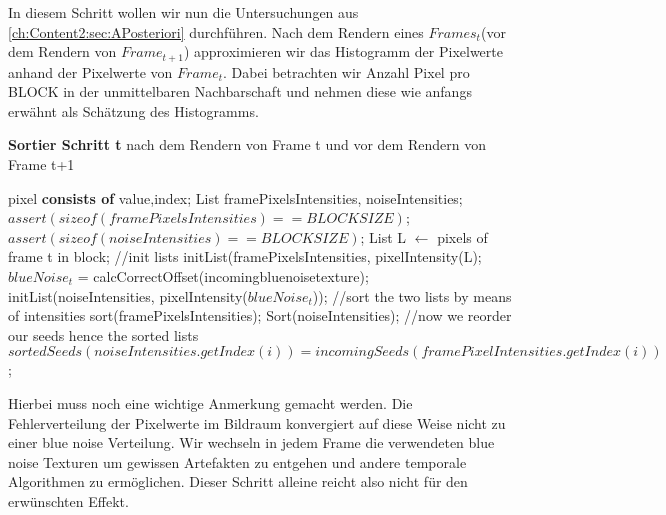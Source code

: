 In diesem Schritt wollen wir nun die Untersuchungen aus 
\ref{ch:Content2:sec:APosteriori} durchführen. Nach dem Rendern eines
$Frames_{t}$(vor dem Rendern von $Frame_{t+1}$) approximieren wir das Histogramm
der Pixelwerte anhand der Pixelwerte von $Frame_{t}$. Dabei betrachten wir
Anzahl Pixel pro BLOCK in der unmittelbaren Nachbarschaft und nehmen diese
wie anfangs erwähnt als Schätzung des Histogramms.

\cite{hal02158423}
\begin{algorithm}[H]
    \caption{\textbf{Sortier Schritt t} nach dem Rendern von Frame t
    und vor dem Rendern von Frame t+1}
    \begin{algorithmic}[1]
        \STATE pixel \textbf{consists of} value,index;
        \STATE List framePixelsIntensities, noiseIntensities;
        \STATE $assert(sizeof(framePixelsIntensities)==BLOCKSIZE)$;
        \STATE $assert(sizeof(noiseIntensities)==BLOCKSIZE)$;
        \STATE List L $\leftarrow$ pixels of frame t in block;
        \STATE \hfill
        \STATE //init lists
        \STATE initList(framePixelsIntensities, pixelIntensity(L);
        \STATE $blueNoise_{t}$ = calcCorrectOffset(incomingbluenoisetexture);
        \STATE initList(noiseIntensities, pixelIntensity($blueNoise_{t}$));
        \STATE \hfill
        \STATE //sort the two lists by means of intensities
        \STATE sort(framePixelsIntensities);
        \STATE Sort(noiseIntensities);
        \STATE \hfill
        \STATE //now we reorder our seeds hence the sorted lists
        \STATE $sortedSeeds(noiseIntensities.getIndex(i)) = incomingSeeds(framePixelIntensities.getIndex(i))$;
        \ENDFOR
    \end{algorithmic}
    \label{alg:Sortier}
\end{algorithm}

Hierbei muss noch eine wichtige Anmerkung gemacht werden. Die Fehlerverteilung
der Pixelwerte im Bildraum konvergiert auf diese Weise nicht zu einer 
blue noise Verteilung. Wir wechseln in jedem Frame die 
verwendeten blue noise Texturen um gewissen Artefakten zu entgehen und 
andere temporale Algorithmen zu ermöglichen. Dieser Schritt alleine reicht
also nicht für den erwünschten Effekt.